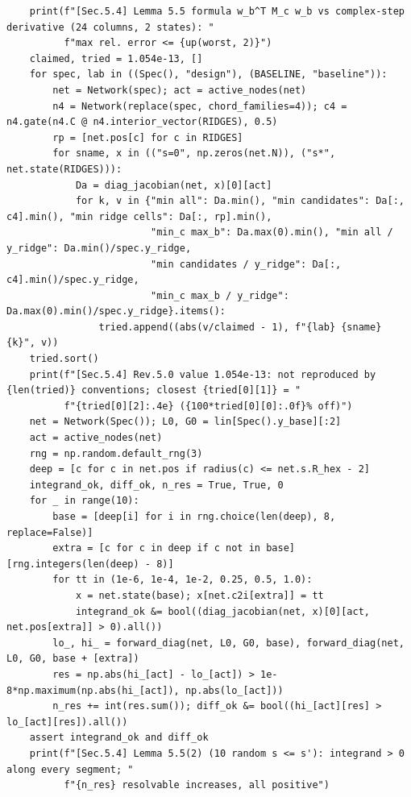 \documentclass[11pt,a4paper]{article}
\theoremstyle{definition}
\theoremstyle{remark}
\begin{document}
\begin{lstlisting}
    print(f"[Sec.5.4] Lemma 5.5 formula w_b^T M_c w_b vs complex-step derivative (24 columns, 2 states): "
          f"max rel. error <= {up(worst, 2)}")
    claimed, tried = 1.054e-13, []
    for spec, lab in ((Spec(), "design"), (BASELINE, "baseline")):
        net = Network(spec); act = active_nodes(net)
        n4 = Network(replace(spec, chord_families=4)); c4 = n4.gate(n4.C @ n4.interior_vector(RIDGES), 0.5)
        rp = [net.pos[c] for c in RIDGES]
        for sname, x in (("s=0", np.zeros(net.N)), ("s*", net.state(RIDGES))):
            Da = diag_jacobian(net, x)[0][act]
            for k, v in {"min all": Da.min(), "min candidates": Da[:, c4].min(), "min ridge cells": Da[:, rp].min(),
                         "min_c max_b": Da.max(0).min(), "min all / y_ridge": Da.min()/spec.y_ridge,
                         "min candidates / y_ridge": Da[:, c4].min()/spec.y_ridge,
                         "min_c max_b / y_ridge": Da.max(0).min()/spec.y_ridge}.items():
                tried.append((abs(v/claimed - 1), f"{lab} {sname} {k}", v))
    tried.sort()
    print(f"[Sec.5.4] Rev.5.0 value 1.054e-13: not reproduced by {len(tried)} conventions; closest {tried[0][1]} = "
          f"{tried[0][2]:.4e} ({100*tried[0][0]:.0f}% off)")
    net = Network(Spec()); L0, G0 = lin[Spec().y_base][:2]
    act = active_nodes(net)
    rng = np.random.default_rng(3)
    deep = [c for c in net.pos if radius(c) <= net.s.R_hex - 2]
    integrand_ok, diff_ok, n_res = True, True, 0
    for _ in range(10):
        base = [deep[i] for i in rng.choice(len(deep), 8, replace=False)]
        extra = [c for c in deep if c not in base][rng.integers(len(deep) - 8)]
        for tt in (1e-6, 1e-4, 1e-2, 0.25, 0.5, 1.0):
            x = net.state(base); x[net.c2i[extra]] = tt
            integrand_ok &= bool((diag_jacobian(net, x)[0][act, net.pos[extra]] > 0).all())
        lo_, hi_ = forward_diag(net, L0, G0, base), forward_diag(net, L0, G0, base + [extra])
        res = np.abs(hi_[act] - lo_[act]) > 1e-8*np.maximum(np.abs(hi_[act]), np.abs(lo_[act]))
        n_res += int(res.sum()); diff_ok &= bool((hi_[act][res] > lo_[act][res]).all())
    assert integrand_ok and diff_ok
    print(f"[Sec.5.4] Lemma 5.5(2) (10 random s <= s'): integrand > 0 along every segment; "
          f"{n_res} resolvable increases, all positive")



\end{lstlisting}
\end{document}

